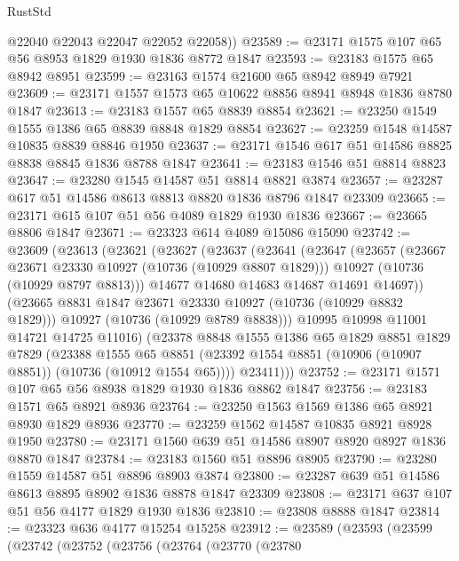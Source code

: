 \begin{lexlean}{RustStd}
\begin{coremodule}
        @22040
        @22043
        @22047
        @22052
        @22058))
@23589 := @23171 @1575 @107 @65 @56 @8953 @1829 @1930 @1836 @8772 @1847
@23593 := @23183 @1575 @65 @8942 @8951
@23599 := @23163 @1574 @21600 @65 @8942 @8949 @7921
@23609 := @23171 @1557 @1573 @65 @10622 @8856 @8941 @8948 @1836 @8780 @1847
@23613 := @23183 @1557 @65 @8839 @8854
@23621 := @23250 @1549 @1555 @1386 @65 @8839 @8848 @1829 @8854
@23627 := @23259 @1548 @14587 @10835 @8839 @8846 @1950
@23637 := @23171 @1546 @617 @51 @14586 @8825 @8838 @8845 @1836 @8788 @1847
@23641 := @23183 @1546 @51 @8814 @8823
@23647 := @23280 @1545 @14587 @51 @8814 @8821 @3874
@23657 := @23287 @617 @51 @14586 @8613 @8813 @8820 @1836 @8796 @1847 @23309
@23665 := @23171 @615 @107 @51 @56 @4089 @1829 @1930 @1836
@23667 := @23665 @8806 @1847
@23671 := @23323 @614 @4089 @15086 @15090
@23742 := @23609
    (@23613
      (@23621
        (@23627
          (@23637
            (@23641
              (@23647
                (@23657
                  (@23667 @23671 @23330 @10927 (@10736 (@10929 @8807 @1829)))
                  @10927
                  (@10736 (@10929 @8797 @8813)))
                @14677
                @14680
                @14683
                @14687
                @14691
                @14697))
            (@23665 @8831 @1847 @23671 @23330 @10927 (@10736 (@10929 @8832 @1829)))
            @10927
            (@10736 (@10929 @8789 @8838)))
          @10995
          @10998
          @11001
          @14721
          @14725
          @11016)
        (@23378
          @8848
          @1555
          @1386
          @65
          @1829
          @8851
          @1829
          @7829
          (@23388
            @1555
            @65
            @8851
            (@23392 @1554 @8851 (@10906 (@10907 @8851)) (@10736 (@10912 @1554 @65))))
          @23411)))
@23752 := @23171 @1571 @107 @65 @56 @8938 @1829 @1930 @1836 @8862 @1847
@23756 := @23183 @1571 @65 @8921 @8936
@23764 := @23250 @1563 @1569 @1386 @65 @8921 @8930 @1829 @8936
@23770 := @23259 @1562 @14587 @10835 @8921 @8928 @1950
@23780 := @23171 @1560 @639 @51 @14586 @8907 @8920 @8927 @1836 @8870 @1847
@23784 := @23183 @1560 @51 @8896 @8905
@23790 := @23280 @1559 @14587 @51 @8896 @8903 @3874
@23800 := @23287 @639 @51 @14586 @8613 @8895 @8902 @1836 @8878 @1847 @23309
@23808 := @23171 @637 @107 @51 @56 @4177 @1829 @1930 @1836
@23810 := @23808 @8888 @1847
@23814 := @23323 @636 @4177 @15254 @15258
@23912 := @23589
    (@23593
      (@23599
        (@23742
          (@23752
            (@23756
              (@23764
                (@23770
                  (@23780

\end{coremodule}
\end{lexlean}
